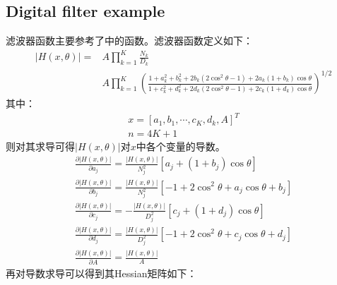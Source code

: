 \documentclass{ctexart}
\begin{document}
\subsection{Digital filter example}
滤波器函数主要参考了\cite{Charalambous1974Minimax}中的函数。滤波器函数定义如下：
\begin{align}
|H(x,\theta)|=&A\prod_{k=1}^{K}{\frac{N_k}{D_k}}\\
		&A\prod_{k=1}^{K}{(\frac{1+a_k^2+b_k^2+2b_k(2\cos^2\theta-1)+2a_k(1+b_k)\cos\theta}{1+c_k^2+d_k^2+2d_k(2\cos^2\theta-1)+2c_k(1+d_k)\cos\theta})^{1/2}}
\end{align}
其中：
\begin{align}
	x=[a_1,b_1,\cdots,c_K,d_k,A]^T\\
	n=4K+1
\end{align}
则对其求导可得$|H(x,\theta)|$对$x$中各个变量的导数。
\begin{align}
	\frac{\partial{|H(x,\theta)|}}{\partial{a_j}}=\frac{|H(x,\theta)|}{N_j^2}[a_j+(1+b_j)\cos\theta]\\
	\frac{\partial{|H(x,\theta)|}}{\partial{b_j}}=\frac{|H(x,\theta)|}{N_j^2}[-1+2\cos^2\theta+a_j\cos\theta+b_j]\\
	\frac{\partial{|H(x,\theta)|}}{\partial{c_j}}=-\frac{|H(x,\theta)|}{D_j^2}[c_j+(1+d_j)\cos\theta]\\
	\frac{\partial{|H(x,\theta)|}}{\partial{d_j}}=\frac{|H(x,\theta)|}{D_j^2}[-1+2\cos^2\theta+c_j\cos\theta+d_j]\\
	\frac{\partial{|H(x,\theta)|}}{\partial{A}}=\frac{|H(x,\theta)|}{A}
\end{align}
再对导数求导可以得到其Hessian矩阵如下：
\end{document}
